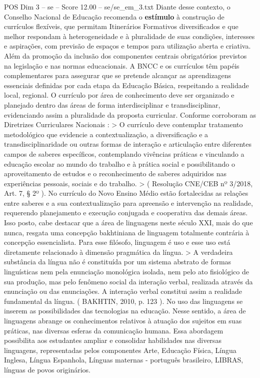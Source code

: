 \begin{textsample}{POS Dim 3 – se – Score 12.00 – se/se\_em\_3.txt}
Diante desse contexto, o Conselho Nacional de Educação recomenda o \textbf{estímulo} à construção de currículos flexíveis, que permitam Itinerários Formativos diversificados e que melhor respondam à heterogeneidade e à pluralidade de suas condições, interesses e aspirações, com previsão de espaços e tempos para utilização aberta e criativa.
Além da promoção da inclusão dos componentes centrais obrigatórios previstos na legislação e nas normas educacionais.
A BNCC e os currículos têm papéis complementares para assegurar que se pretende alcançar as aprendizagens essenciais definidas por cada etapa da Educação Básica, respeitando a realidade local, regional.
O currículo por área de conhecimento deve ser organizado e planejado dentro das áreas de forma interdisciplinar e transdisciplinar, evidenciando assim a pluralidade da proposta curricular.
Conforme corroboram as Diretrizes Curriculares Nacionais : > O currículo deve contemplar tratamento metodológico que evidencie a contextualização, a diversificação e a transdisciplinaridade ou outras formas de interação e articulação entre diferentes campos de saberes específicos, contemplando vivências práticas e vinculando a educação escolar ao mundo do trabalho e à prática social e possibilitando o aproveitamento de estudos e o reconhecimento de saberes adquiridos nas experiências pessoais, sociais e do trabalho. > ( Resolução CNE/CEB nº 3/2018, Art. 7, § 2º ).
No currículo do Novo Ensino Médio estão fortalecidas as relações entre saberes e a sua contextualização para apreensão e intervenção na realidade, requerendo planejamento e execução conjugada e cooperativa das demais áreas.
Isso posto, cabe destacar que a área de linguagens neste século XXI, mais do que nunca, resgata uma concepção bakhtiniana de linguagem totalmente contrária à concepção essencialista.
Para esse filósofo, linguagem é uso e esse uso está diretamente relacionado à dimensão pragmática da língua. > A verdadeira substância da língua não é constituída por um sistema abstrato de formas linguísticas nem pela enunciação monológica isolada, nem pelo ato fisiológico de sua produção, mas pelo fenômeno social da interação verbal, realizada através da enunciação ou das enunciações.
A interação verbal constitui assim a realidade fundamental da língua. ( BAKHTIN, 2010, p. 123 ).
No uso das linguagens se inserem as possibilidades das tecnologias na educação.
Nesse sentido, a área de linguagens abrange os conhecimentos relativos à atuação dos sujeitos em suas práticas, nas diversas esferas da comunicação humana.
Essa abordagem possibilita aos estudantes ampliar e consolidar habilidades nas diversas linguagens, representadas pelos componentes Arte, Educação Física, Língua Inglesa, Língua Espanhola, Línguas maternas - português brasileiro, LIBRAS, línguas de povos originários.

\end{textsample}
